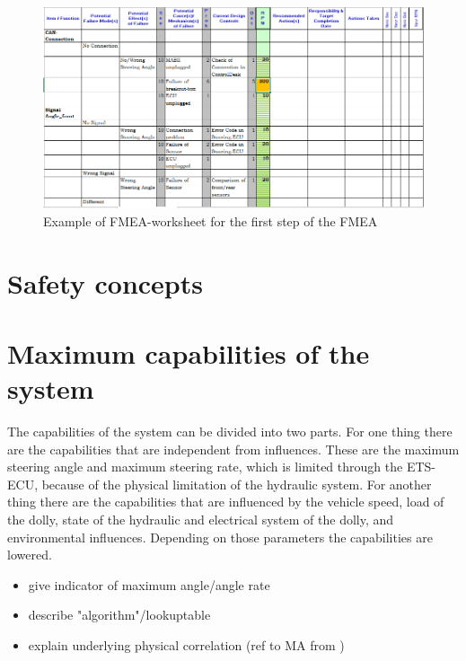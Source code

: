 \documentclass[ExampleMasters.tex]{subfiles}
\begin{document}
\begin{figure}[h]
	\centering
	\includegraphics[width=1.0\linewidth]{figures/fmea_example}
	\caption[]{Example of FMEA-worksheet for the first step of the FMEA}
	\label{fig:fmea_example}
\end{figure}

\section{Safety concepts}
\label{sec:safetyconcepts}

\section{Maximum capabilities of the system}
\label{sec:maxi_capabilities}
The capabilities of the system can be divided into two parts. For one thing there are the capabilities that are independent from influences. These are the maximum steering angle and maximum steering rate, which is limited through the ETS-ECU, because of the physical limitation of the hydraulic system.
For another thing there are the capabilities that are influenced by the vehicle speed, load of the dolly, state of the hydraulic and electrical system of the dolly, and environmental influences.
Depending on those parameters the capabilities are lowered.
\begin{itemize}
	\item give indicator of maximum angle/angle rate
	\item describe "algorithm"/lookuptable
	\item explain underlying physical correlation (ref to MA from )
\end{itemize}
\end{document}
